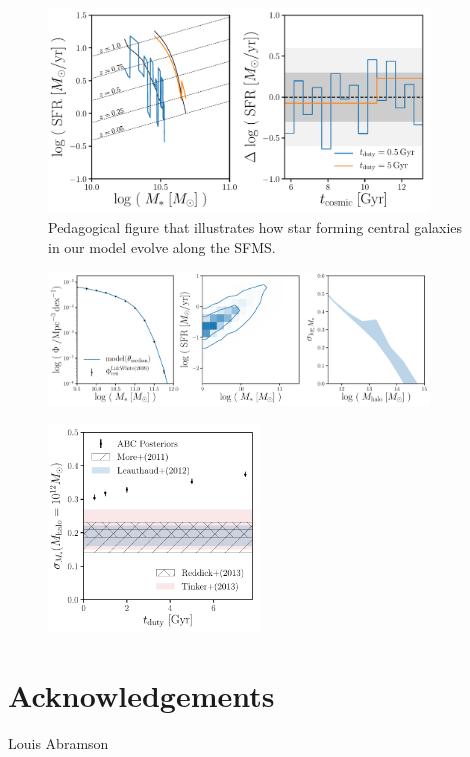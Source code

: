 \documentclass[12pt, letterpaper, preprint]{aastex}
\begin{document}
\begin{figure}
\begin{center}
\includegraphics[width=0.9\textwidth]{figs/sfh_pedagogical.pdf}
\caption{Pedagogical figure that illustrates how star forming central galaxies in our model
evolve along the SFMS.}
\label{fig:sfh_model}
\end{center}
\end{figure}

\begin{figure}
\begin{center}
\includegraphics[width=0.9\textwidth]{figs/qaplot_abc_test0_t14.pdf}
\caption{}
\label{fig:abc_demo}
\end{center}
\end{figure}

\begin{figure}
\begin{center}
\includegraphics[width=0.5\textwidth]{figs/sigMstar_tduty.pdf}
\caption{}
\label{fig:abc_demo}
\end{center}
\end{figure}

\section*{Acknowledgements}
Louis Abramson



\end{document}
